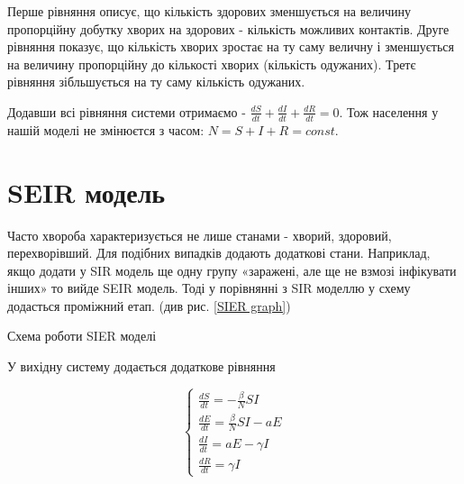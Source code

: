 Перше рівняння описує,
що кількість здорових зменшується на величину 
пропорційну добутку хворих на здорових - кількість можливих контактів. 
Друге рівняння показує, що кількість хворих зростає на ту саму величну і зменшується на величину пропорційну до кількості хворих (кількість одужаних). 
Третє рівняння зібльшується на ту саму кількість одужаних.
\par 
Додавши всі рівняння системи отримаємо - $ \frac{dS}{dt} + \frac{dI}{dt} + \frac{dR}{dt} = 0 $. 
Тож населення у нашій моделі не змінюєтся з часом: 
$N = S + I + R = const$.\cite{salimipour_sir_2023}


\section{SEIR модель}

Часто хвороба характеризується не лише станами - хворий, здоровий, перехворівший.
Для подібних випадків додають додаткові стани.
Наприклад, якщо додати у SIR модель ще одну групу «заражені, але ще не взмозі інфікувати інших» то вийде SEIR модель. 
Тоді у порівнянні з SIR моделлю у схему додасться проміжний етап. (див рис. \ref{SIER graph})

\begin{risunok}[ht]
    \centering
    \vspace{0.5cm}
    \caption{Схема роботи SIER моделі}
    \label{SIER graph}
\end{risunok}

У вихідну систему додається додаткове рівняння

\begin{equation*}
    \begin{cases}
        \frac{dS}{dt} = - \frac{\beta}{N}SI    \\
        \frac{dE}{dt} = \frac{\beta}{N}SI - aE \\
        \frac{dI}{dt} = aE - \gamma I          \\
        \frac{dR}{dt} = \gamma I
    \end{cases}
\end{equation*}

